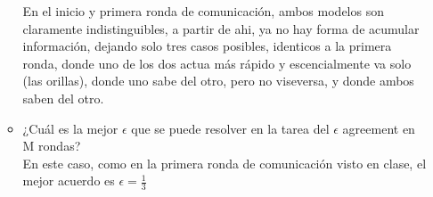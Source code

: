 \documentclass{article}
\begin{document}
\begin{enumerate}
\begin{itemize}
En el inicio y primera ronda de comunicación, ambos modelos son claramente indistinguibles, a partir de ahi, ya no hay forma de acumular información, dejando solo tres casos posibles, identicos a la primera ronda, donde uno de los dos actua más rápido y escencialmente va solo (las orillas), donde uno sabe del otro, pero no viseversa, y donde ambos saben del otro.


\item ¿Cuál es la mejor $\epsilon$ que se puede resolver en la tarea del $\epsilon$ agreement en M rondas?\\

En este caso, como en la primera ronda de comunicación visto en clase, el mejor acuerdo es $\epsilon=\frac{1}{3}$
\end{itemize}





\end{enumerate}
\end{document}
